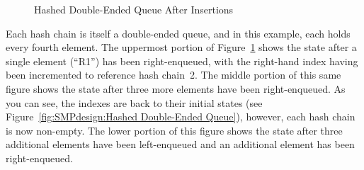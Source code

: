 \begin{figure}[tb]
\begin{center}
\end{center}
\caption{Hashed Double-Ended Queue After Insertions}
\label{fig:SMPdesign:Hashed Double-Ended Queue After Insertions}
\end{figure}

Each hash chain is itself a double-ended queue, and in this example,
each holds every fourth element.
The uppermost portion of
Figure~\ref{fig:SMPdesign:Hashed Double-Ended Queue After Insertions}
shows the state after a single element (``R1'') has been
right-enqueued, with the right-hand index having been incremented to
reference hash chain~2.
The middle portion of this same figure shows the state after
three more elements have been right-enqueued.
As you can see, the indexes are back to their initial states
(see Figure~\ref{fig:SMPdesign:Hashed Double-Ended Queue}), however,
each hash chain is now non-empty.
The lower portion of this figure shows the state after three additional
elements have been left-enqueued and an additional element has been
right-enqueued.

